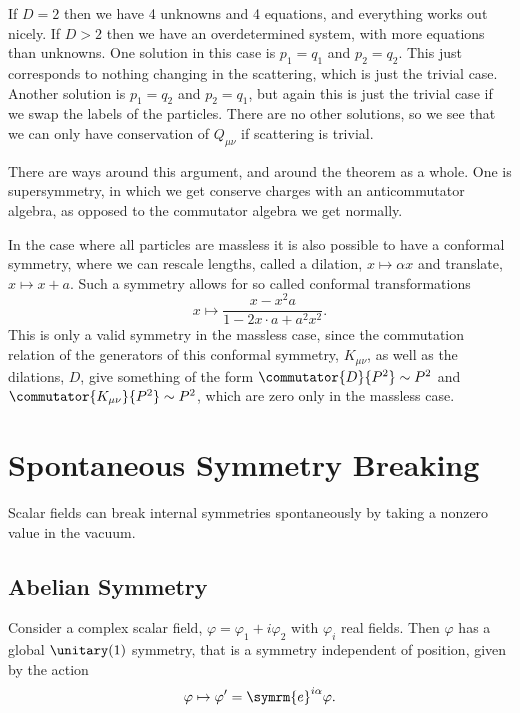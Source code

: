 \documentclass[fleqn]{NotesClass}
\newcommand{\e}{\symrm{e}}
\begin{document}
    If \(D = 2\) then we have 4 unknowns and 4 equations, and everything works out nicely.
    If \(D > 2\) then we have an overdetermined system, with more equations than unknowns.
    One solution in this case is \(p_1 = q_1\) and \(p_2 = q_2\).
    This just corresponds to nothing changing in the scattering, which is just the trivial case.
    Another solution is \(p_1 = q_2\) and \(p_2 = q_1\), but again this is just the trivial case if we swap the labels of the particles.
    There are no other solutions, so we see that we can only have conservation of \(Q_{\mu\nu}\) if scattering is trivial.
    
    There are ways around this argument, and around the theorem as a whole.
    One is supersymmetry, in which we get conserve charges with an anticommutator algebra, as opposed to the commutator algebra we get normally.
    
    In the case where all particles are massless it is also possible to have a conformal symmetry, where we can rescale lengths, called a dilation, \(x \mapsto \alpha x\) and translate, \(x \mapsto x + a\).
    Such a symmetry allows for so called conformal transformations
    \begin{equation}
        x \mapsto \frac{x - x^2 a}{1 - 2x \cdot a + a^2 x^2}.
    \end{equation}
    This is only a valid symmetry in the massless case, since the commutation relation of the generators of this conformal symmetry, \(K_{\mu\nu}\), as well as the dilations, \(D\), give something of the form \(\commutator{D}{P^2} \sim P^2\) and \(\commutator{K_{\mu\nu}}{P^2} \sim P^2\), which are zero only in the massless case.
    
    
    \chapter{Spontaneous Symmetry Breaking}
    Scalar fields can break internal symmetries spontaneously by taking a nonzero value in the vacuum.
    
    \section{Abelian Symmetry}\label{sec:abelian symmetry spontaneous symmetry breaking}
    Consider a complex scalar field, \(\varphi = \varphi_1 + i\varphi_2\) with \(\varphi_i\) real fields.
    Then \(\varphi\) has a global \(\unitary(1)\) symmetry, that is a symmetry independent of position, given by the action
    \begin{equation}
        \varphi \mapsto \varphi' = \e^{i\alpha} \varphi.
    \end{equation}
    
\end{document}
